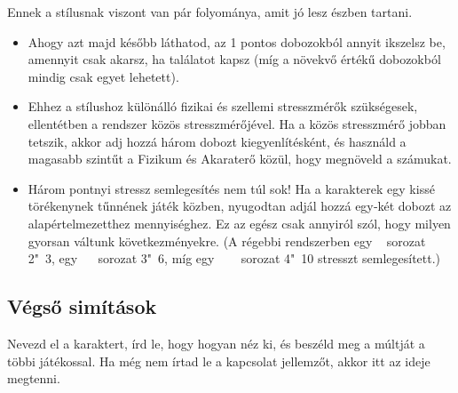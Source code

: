 Ennek a stílusnak viszont van pár folyománya, amit jó lesz észben tartani.

\begin{itemize}
    \item Ahogy azt majd később láthatod, az 1 pontos dobozokból annyit ikszelsz be, amennyit csak akarsz, ha találatot kapsz (míg a növekvő értékű dobozokból mindig csak egyet lehetett).
    \item Ehhez a stílushoz különálló fizikai és szellemi stresszmérők szükségesek, ellentétben a  rendszer közös stresszmérőjével. Ha a közös stresszmérő jobban tetszik, akkor adj hozzá három dobozt kiegyenlítésként, és használd a magasabb szintűt a Fizikum és Akaraterő közül, hogy megnöveld a számukat.
    \item Három pontnyi stressz semlegesítés nem túl sok! Ha a karakterek egy kissé törékenynek tűnnének játék közben, nyugodtan adjál hozzá egy‑két dobozt az alapértelmezetthez mennyiséghez. Ez az egész csak annyiról szól, hogy milyen gyorsan váltunk következményekre. (A régebbi rendszerben egy ~ sorozat 2"~3, egy ~~ sorozat 3"~6, míg egy ~~~ sorozat 4"~10 stresszt semlegesített.)
\end{itemize}

\subsection{Végső simítások}

Nevezd el a karaktert, írd le, hogy hogyan néz ki, és beszéld meg a múltját a többi játékossal. Ha még nem írtad le a kapcsolat jellemzőt, akkor itt az ideje megtenni.
